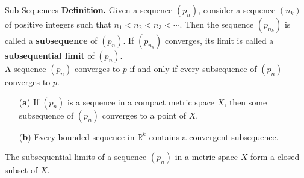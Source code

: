 \documentclass{beamer}
\begin{document}
\begin{frame}{Sub-Sequences}
\textbf{Definition.} Given a sequence $(p_n)$, consider a sequence $(n_k)$ of
positive integers such that $n_1 < n_2 < n_3 < \cdots$. Then the sequence
$(p_{n_k})$ is called a \textbf{subsequence} of $(p_n)$. If $(p_{n_k})$
converges, its limit is called a \textbf{subsequential limit} of $(p_n)$. \\ 

A sequence $(p_n)$ converges to $p$ if and only if every subsequence of $(p_n)$ converges to $p$.

\begin{theorem}
\begin{enumerate}
    \item[(\textbf{a})] If $(p_n)$ is a sequence in a compact metric space $X$, then some subsequence of $(p_n)$ converges to a point of $X$.
    \item[(\textbf{b})] Every bounded sequence in $\mathbb{R}^k$ contains a convergent subsequence.
\end{enumerate}
\end{theorem}

\begin{theorem}
The subsequential limits of a sequence $(p_n)$ in a metric space $X$ form a closed subset of $X$.
\end{theorem}
\end{frame}
\end{document}
